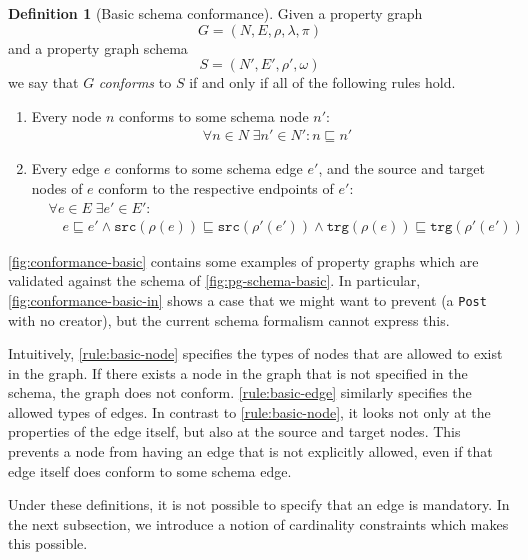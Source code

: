 \documentclass{report}
\theoremstyle{definition}
\newtheorem{definition}{Definition}
\newcommand{\src}{\mathtt{src}}
\newcommand{\trg}{\mathtt{trg}}
\newcommand{\conf}{\sqsubseteq}
\begin{document}
\begin{definition}[Basic schema conformance]
  \label{def:schema-conformance-basic}
  Given a property graph $$G = (N, E, \rho, \lambda, \pi)$$ and a property graph schema $$S = (N', E', \rho', \omega)$$ we say that $G$ \emph{conforms} to $S$ if and only if all of the following rules hold.

  \begin{enumerate}
    \item\label{rule:basic-node}
    Every node $n$ conforms to some schema node $n'$:
    \begin{align*}
       & \forall n \in N \; \exists n' \in N' : n \conf n'
    \end{align*}

    \item\label{rule:basic-edge}
    Every edge $e$ conforms to some schema edge $e'$, and the source and target nodes of $e$ conform to the respective endpoints of $e'$:
    \begin{align*}
       & \forall e \in E \; \exists e' \in E' :                      \\
       & \quad e \conf e' \wedge \src(\rho(e)) \conf \src(\rho'(e'))
      \wedge \trg(\rho(e)) \conf \trg(\rho'(e'))
    \end{align*}
  \end{enumerate}
\end{definition}

\autoref{fig:conformance-basic} contains some examples of property graphs which are validated against the schema of \autoref{fig:pg-schema-basic}. In particular, \autoref{fig:conformance-basic-in} shows a case that we might want to prevent (a \texttt{Post} with no creator), but the current schema formalism cannot express this.

Intuitively, \autoref{rule:basic-node} specifies the types of nodes that are allowed to exist in the graph. If there exists a node in the graph that is not specified in the schema, the graph does not conform. \autoref{rule:basic-edge} similarly specifies the allowed types of edges. In contrast to \autoref{rule:basic-node}, it looks not only at the properties of the edge itself, but also at the source and target nodes. This prevents a node from having an edge that is not explicitly allowed, even if that edge itself does conform to some schema edge.

Under these definitions, it is not possible to specify that an edge is mandatory. In the next subsection, we introduce a notion of cardinality constraints which makes this possible.
\end{document}
